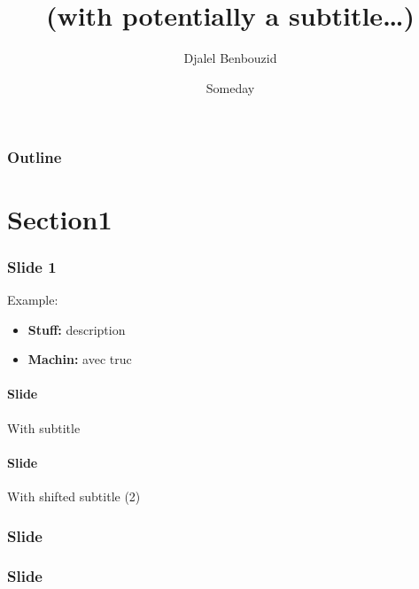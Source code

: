 \documentclass[aspectratio=169]{beamer}
\begin{document}
    \title{\selectfont{The title of the talk}\\\medskip
    \large\textcolor{beautyblue}{
    \textbf{(with potentially a subtitle\ldots)}} \medskip}
    \author[{Djalel Benbouzid}]{\textcolor{grizoo}{Djalel Benbouzid}}
    \date[someday\ldots]{Someday}%
    \begin{frame}
        \titlepage
    \end{frame}
    \begin{frame}
        \frametitle{Outline}
        \tableofcontents
    \end{frame}

    \section{Section1}

    \begin{frame}[c]
        \frametitle{Slide 1}
        Example:
        \begin{itemize}
            \item \textbf{Stuff:} description
            \item \textbf{Machin:} avec truc
        \end{itemize}
    \end{frame}

    \begin{frame}[c]
        \framesubtitle{Slide}{With subtitle}
        \blindtext
    \end{frame}

    \begin{frame}[c]
        \framesubtitle{Slide}{With shifted subtitle (2)}
        \blindmathtrue
        \blindtext
    \end{frame}

    \begin{frame}[c]
        \frametitle[1cm]{Slide}
        \blinditemize

    \end{frame}

    \begin{frame}[c]
        \frametitle[1cm]{Slide}
        \blinddescription
    \end{frame}
\end{document}
